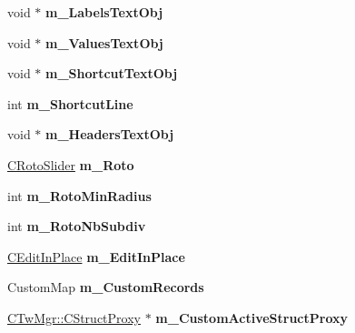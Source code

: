\begin{DoxyCompactItemize}
\item 
\hypertarget{struct_c_tw_bar_aab90b7360740c6ca0cba65ee6eb0cbe2}{void $\ast$ {\bfseries m\+\_\+\+Labels\+Text\+Obj}}\label{struct_c_tw_bar_aab90b7360740c6ca0cba65ee6eb0cbe2}

\item 
\hypertarget{struct_c_tw_bar_ae4b23582a7d7ae690277b9ca8b69defe}{void $\ast$ {\bfseries m\+\_\+\+Values\+Text\+Obj}}\label{struct_c_tw_bar_ae4b23582a7d7ae690277b9ca8b69defe}

\item 
\hypertarget{struct_c_tw_bar_ad8a3f9a895b9aa1eac2146ca3cd9ccea}{void $\ast$ {\bfseries m\+\_\+\+Shortcut\+Text\+Obj}}\label{struct_c_tw_bar_ad8a3f9a895b9aa1eac2146ca3cd9ccea}

\item 
\hypertarget{struct_c_tw_bar_a794e4f92b290d6f7093fac41273b28ce}{int {\bfseries m\+\_\+\+Shortcut\+Line}}\label{struct_c_tw_bar_a794e4f92b290d6f7093fac41273b28ce}

\item 
\hypertarget{struct_c_tw_bar_a4cefd271bfd7dfb299f1079f20deb31e}{void $\ast$ {\bfseries m\+\_\+\+Headers\+Text\+Obj}}\label{struct_c_tw_bar_a4cefd271bfd7dfb299f1079f20deb31e}

\item 
\hypertarget{struct_c_tw_bar_a728d824075a4fa4a70d15664a3c4d672}{\hyperlink{struct_c_tw_bar_1_1_c_roto_slider}{C\+Roto\+Slider} {\bfseries m\+\_\+\+Roto}}\label{struct_c_tw_bar_a728d824075a4fa4a70d15664a3c4d672}

\item 
\hypertarget{struct_c_tw_bar_a47c27bcba067a347592a1c895eaa34a5}{int {\bfseries m\+\_\+\+Roto\+Min\+Radius}}\label{struct_c_tw_bar_a47c27bcba067a347592a1c895eaa34a5}

\item 
\hypertarget{struct_c_tw_bar_a9fd81c7ac7ab289bcb8bb093b25d5c35}{int {\bfseries m\+\_\+\+Roto\+Nb\+Subdiv}}\label{struct_c_tw_bar_a9fd81c7ac7ab289bcb8bb093b25d5c35}

\item 
\hypertarget{struct_c_tw_bar_aa26e5d12b58a2482d8fb9eab0498fede}{\hyperlink{struct_c_tw_bar_1_1_c_edit_in_place}{C\+Edit\+In\+Place} {\bfseries m\+\_\+\+Edit\+In\+Place}}\label{struct_c_tw_bar_aa26e5d12b58a2482d8fb9eab0498fede}

\item 
\hypertarget{struct_c_tw_bar_a416f44873f8165f301bb3fdabe6e7201}{Custom\+Map {\bfseries m\+\_\+\+Custom\+Records}}\label{struct_c_tw_bar_a416f44873f8165f301bb3fdabe6e7201}

\item 
\hypertarget{struct_c_tw_bar_ad3db749daa402a1318159735732231cc}{\hyperlink{struct_c_tw_mgr_1_1_c_struct_proxy}{C\+Tw\+Mgr\+::\+C\+Struct\+Proxy} $\ast$ {\bfseries m\+\_\+\+Custom\+Active\+Struct\+Proxy}}\label{struct_c_tw_bar_ad3db749daa402a1318159735732231cc}

\end{DoxyCompactItemize}
